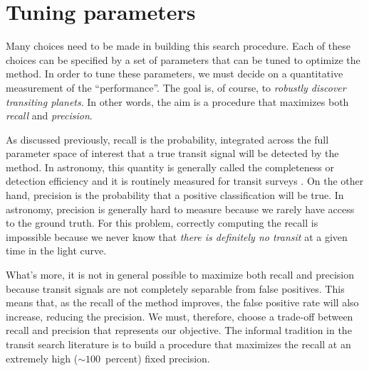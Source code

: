 \documentclass[12pt,preprint]{aastex}
\newcommand{\sectlabel}[1]{\label{sect:#1}}
\begin{document}
\section{Tuning parameters}\sectlabel{tuning}

Many choices need to be made in building this search procedure.
Each of these choices can be specified by a set of parameters that can be
tuned to optimize the method.
In order to tune these parameters, we must decide on a quantitative
measurement of the ``performance''.
The goal is, of course, to \emph{robustly discover transiting planets}.
In other words, the aim is a procedure that maximizes both \emph{recall} and
\emph{precision}.

As discussed previously, recall is the probability, integrated across the full
parameter space of interest that a true transit signal will be detected by the
method.
In astronomy, this quantity is generally called the completeness or detection
efficiency and it is routinely measured for transit surveys
\citep{Petigura:2013, Dressing:2015, Foreman-Mackey:2015}.
On the other hand, precision is the probability that a positive classification
will be true.
In astronomy, precision is generally hard to measure because we rarely have
access to the ground truth.
For this problem, correctly computing the recall is impossible because we
never know that \emph{there is definitely no transit} at a given time in the
light curve.

What's more, it is not in general possible to maximize both recall and
precision because transit signals are not completely separable from false
positives.
This means that, as the recall of the method improves, the false positive rate
will also increase, reducing the precision.
We must, therefore, choose a trade-off between recall and precision that
represents our objective.
The informal tradition in the transit search literature is to build a
procedure that maximizes the recall at an extremely high ($\sim 100$~percent)
fixed precision.
\end{document}
